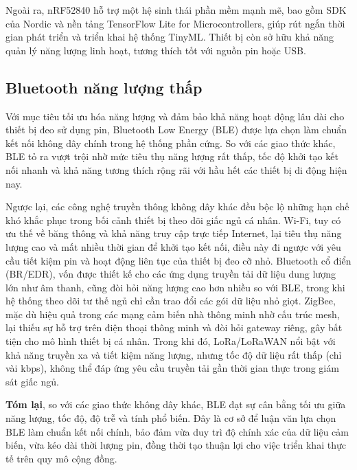 Ngoài ra, nRF52840 hỗ trợ một hệ sinh thái phần mềm mạnh mẽ, bao gồm SDK 
của Nordic và nền tảng TensorFlow Lite for Microcontrollers, giúp rút 
ngắn thời gian phát triển và triển khai hệ thống TinyML. Thiết bị còn 
sở hữu khả năng quản lý năng lượng linh hoạt, tương thích tốt với nguồn pin hoặc USB. 





\subsection{Bluetooth năng lượng thấp}

Với mục tiêu tối ưu hóa năng lượng và đảm bảo khả năng hoạt động lâu dài cho thiết bị đeo sử dụng pin, Bluetooth Low Energy (BLE) được lựa chọn làm chuẩn kết nối không dây chính trong hệ thống phần cứng. So với các giao thức khác, BLE tỏ ra vượt trội nhờ mức tiêu thụ năng lượng rất thấp, tốc độ khởi tạo kết nối nhanh và khả năng tương thích rộng rãi với hầu hết các thiết bị di động hiện nay.

Ngược lại, các công nghệ truyền thông không dây khác đều bộc lộ những hạn chế khó khắc phục trong bối cảnh thiết bị theo dõi giấc ngủ cá nhân. Wi-Fi, tuy có ưu thế về băng thông và khả năng truy cập trực tiếp Internet, lại tiêu thụ năng lượng cao và mất nhiều thời gian để khởi tạo kết nối, điều này đi ngược với yêu cầu tiết kiệm pin và hoạt động liên tục của thiết bị đeo cỡ nhỏ. Bluetooth cổ điển (BR/EDR), vốn được thiết kế cho các ứng dụng truyền tải dữ liệu dung lượng lớn như âm thanh, cũng đòi hỏi năng lượng cao hơn nhiều so với BLE, trong khi hệ thống theo dõi tư thế ngủ chỉ cần trao đổi các gói dữ liệu nhỏ giọt. ZigBee, mặc dù hiệu quả trong các mạng cảm biến nhà thông minh nhờ cấu trúc mesh, lại thiếu sự hỗ trợ trên điện thoại thông minh và đòi hỏi gateway riêng, gây bất tiện cho mô hình thiết bị cá nhân. Trong khi đó, LoRa/LoRaWAN nổi bật với khả năng truyền xa và tiết kiệm năng lượng, nhưng tốc độ dữ liệu rất thấp (chỉ vài kbps), không thể đáp ứng yêu cầu truyền tải gần thời gian thực trong giám sát giấc ngủ.


\textbf{Tóm lại}, so với các giao thức không dây khác, BLE đạt sự cân bằng tối ưu giữa năng lượng, tốc độ, độ trễ và tính phổ biến. Đây là cơ sở để luận văn lựa chọn BLE làm chuẩn kết nối chính, bảo đảm vừa duy trì độ chính xác của dữ liệu cảm biến, vừa kéo dài thời lượng pin, đồng thời tạo thuận lợi cho việc triển khai thực tế trên quy mô cộng đồng.

